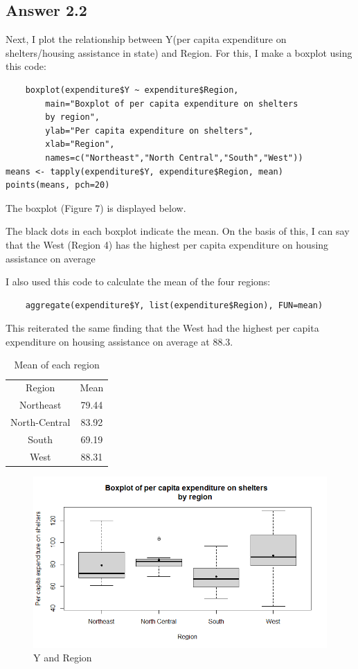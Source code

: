 \documentclass{article}
\begin{document}
\pagebreak
\subsection{Answer 2.2}
Next, I plot the relationship between Y(per capita expenditure on shelters/housing assistance in state) and Region.
For this, I make a boxplot using this code:
\begin{verbatim}
    boxplot(expenditure$Y ~ expenditure$Region,
        main="Boxplot of per capita expenditure on shelters 
        by region",
        ylab="Per capita expenditure on shelters",
        xlab="Region",
        names=c("Northeast","North Central","South","West"))
means <- tapply(expenditure$Y, expenditure$Region, mean)
points(means, pch=20) 
\end{verbatim}

The boxplot (Figure 7) is displayed below.

\noindent The black dots in each boxplot indicate the mean. On the basis of this, I can say that the West (Region 4) has the highest per capita expenditure on housing assistance on average

I also used this code to calculate the mean of the four regions:
\begin{verbatim}
    aggregate(expenditure$Y, list(expenditure$Region), FUN=mean)
\end{verbatim}
This reiterated the same finding that the West had the highest per capita expenditure on housing assistance on average at 88.3.
\begin{table}[]
    \centering
    \begin{tabular}{c|c}
    Region & Mean  \\
    Northeast & 79.44 \\
    North-Central & 83.92 \\
    South & 69.19 \\
    West & 88.31 \\
    \end{tabular}
    \caption{Mean of each region}
    \label{tab:my_label}
\end{table}
\begin{figure}[h]
    \centering
    \includegraphics[width=1.4\textwidth]{Y and Region.png}
    \caption{Y and Region}
    \label{fig:enter-label}
    \FloatBarrier
\end{figure}
\end{document}

